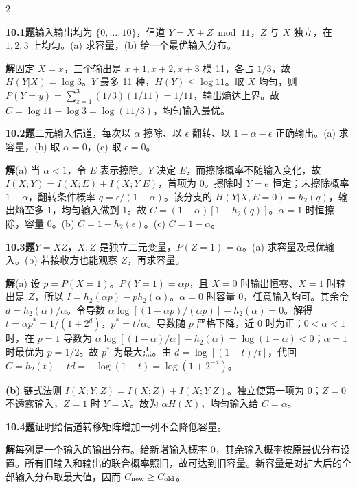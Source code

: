 \documentclass[a4paper]{article}
\newcommand{\cols}{2}
\newcommand{\cols}{4}
\newcommand{\topic}[1]{\par\addvspace{2.6pt}{\color{ink}\bfseries #1}\par\nobreak}
\newcommand{\problem}[2]{\par\addvspace{1.4pt}\textcolor{ink}{\textbf{#1}}\enspace\textbf{题}\enspace #2\par\nobreak}
\newcommand{\solve}{\noindent\textbf{解}\enspace}
\newcommand{\parta}[1]{\par\noindent\textbf{(#1)}\enspace}
\newcommand{\B}{h_2}
\begin{document}
\begin{multicols}{\cols}
\topic{Tut 10 · 信道容量}
\problem{10.1}{输入输出均为 $\{0,\ldots,10\}$，信道 $Y=X+Z\bmod11$，$Z$ 与 $X$ 独立，在 $1,2,3$ 上均匀。(a) 求容量，(b) 给一个最优输入分布。}
\solve 固定 $X=x$，三个输出是 $x+1,x+2,x+3$ 模 11，各占 $1/3$，故 $H(Y|X)=\log3$。$Y$ 最多 11 种，$H(Y)\le\log11$。取 $X$ 均匀，则 $P(Y=y)=\sum_{z=1}^3(1/3)(1/11)=1/11$，输出熵达上界。故 $C=\log11-\log3=\log(11/3)$，均匀输入最优。
\problem{10.2}{二元输入信道，每次以 $\alpha$ 擦除、以 $\epsilon$ 翻转、以 $1-\alpha-\epsilon$ 正确输出。(a) 求容量，(b) 取 $\alpha=0$，(c) 取 $\epsilon=0$。}
\solve (a) 当 $\alpha<1$，令 $E$ 表示擦除。$Y$ 决定 $E$，而擦除概率不随输入变化，故 $I(X;Y)=I(X;E)+I(X;Y|E)$，首项为 0。擦除时 $Y=e$ 恒定；未擦除概率 $1-\alpha$，翻转条件概率 $q=\epsilon/(1-\alpha)$。该分支的 $H(Y|X,E=0)=\B(q)$，输出熵至多 1，均匀输入做到 1。故 $C=(1-\alpha)[1-\B(q)]$。$\alpha=1$ 时恒擦除，容量 0。(b) $C=1-\B(\epsilon)$。(c) $C=1-\alpha$。
\problem{10.3}{$Y=XZ$，$X,Z$ 是独立二元变量，$P(Z=1)=\alpha$。(a) 求容量及最优输入。(b) 若接收方也能观察 $Z$，再求容量。}
\solve (a) 设 $p=P(X=1)$。$P(Y=1)=\alpha p$，且 $X=0$ 时输出恒零、$X=1$ 时输出是 $Z$，所以 $I=\B(\alpha p)-p\B(\alpha)$。$\alpha=0$ 时容量 0，任意输入均可。其余令 $d=\B(\alpha)/\alpha$。令导数 $\alpha\log[(1-\alpha p)/(\alpha p)]-\B(\alpha)=0$。解得 $t=\alpha p^*=1/(1+2^d)$，$p^*=t/\alpha$。导数随 $p$ 严格下降，近 0 时为正；$0<\alpha<1$ 时，在 $p=1$ 导数为 $\alpha\log[(1-\alpha)/\alpha]-\B(\alpha)=\log(1-\alpha)<0$；$\alpha=1$ 时最优为 $p=1/2$。故 $p^*$ 为最大点。由 $d=\log[(1-t)/t]$，代回 $C=\B(t)-td=-\log(1-t)=\log(1+2^{-d})$。
\parta{b} 链式法则 $I(X;Y,Z)=I(X;Z)+I(X;Y|Z)$。独立使第一项为 0；$Z=0$ 不透露输入，$Z=1$ 时 $Y=X$。故为 $\alpha H(X)$，均匀输入给 $C=\alpha$。
\problem{10.4}{证明给信道转移矩阵增加一列不会降低容量。}
\solve 每列是一个输入的输出分布。给新增输入概率 0，其余输入概率按原最优分布设置。所有旧输入和输出的联合概率照旧，故可达到旧容量。新容量是对扩大后的全部输入分布取最大值，因而 $C_{\rm new}\ge C_{\rm old}$。


\end{multicols}
\end{document}
